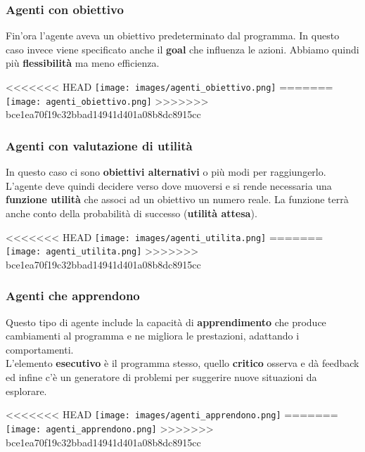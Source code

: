\subsubsection{Agenti con obiettivo}
Fin'ora l'agente aveva un obiettivo predeterminato dal programma. In questo caso invece viene specificato anche il \textbf{goal} che influenza le azioni. Abbiamo quindi più \textbf{flessibilità} ma meno efficienza.
\begin{center}
<<<<<<< HEAD
	\texttt{[image: images/agenti\_obiettivo.png]}
=======
	\texttt{[image: agenti\_obiettivo.png]}
>>>>>>> bce1ea70f19c32bbad14941d401a08b8dc8915cc
\end{center}

\subsubsection{Agenti con valutazione di utilità}
In questo caso ci sono \textbf{obiettivi alternativi} o più modi per raggiungerlo. L'agente deve quindi decidere verso dove muoversi e si rende necessaria una \textbf{funzione utilità} che associ ad un obiettivo un numero reale. La funzione terrà anche conto della probabilità di successo (\textbf{utilità attesa}).
\begin{center}
<<<<<<< HEAD
	\texttt{[image: images/agenti\_utilita.png]}
=======
	\texttt{[image: agenti\_utilita.png]}
>>>>>>> bce1ea70f19c32bbad14941d401a08b8dc8915cc
\end{center}

\subsubsection{Agenti che apprendono}
Questo tipo di agente include la capacità di \textbf{apprendimento} che produce cambiamenti al programma e ne migliora le prestazioni, adattando i comportamenti.\\
L'elemento \textbf{esecutivo} è il programma stesso, quello \textbf{critico} osserva e dà feedback ed infine c'è un generatore di problemi per suggerire nuove situazioni da esplorare.
\begin{center}
<<<<<<< HEAD
	\texttt{[image: images/agenti\_apprendono.png]}
=======
	\texttt{[image: agenti\_apprendono.png]}
>>>>>>> bce1ea70f19c32bbad14941d401a08b8dc8915cc
\end{center}


